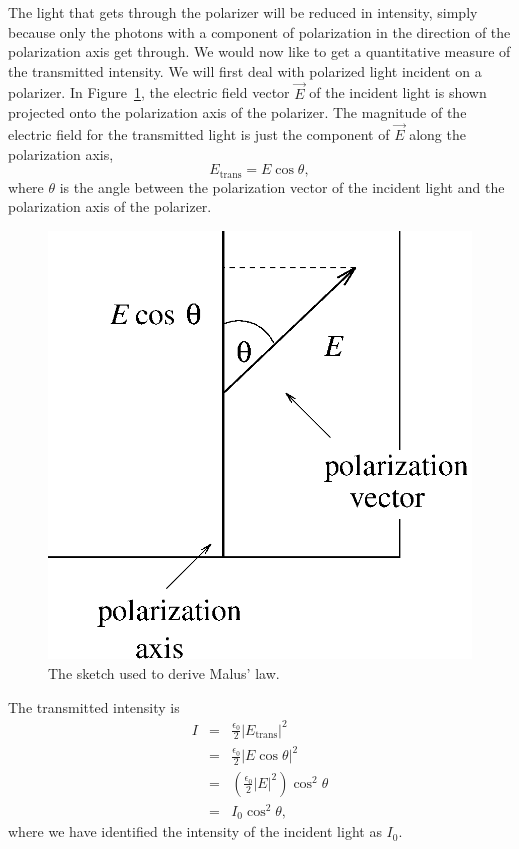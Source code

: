 The light that gets through the polarizer will be reduced in intensity, simply
because only the photons with a component of polarization in the direction of 
the polarization axis get through. We would now like to get a quantitative 
measure of the transmitted intensity.  We will first deal with polarized light 
incident on a polarizer. In Figure~\ref{fig:pol:malus}, the electric field 
vector $\vec{E}$ of the incident light is shown projected onto the 
polarization axis of the polarizer. The magnitude of the electric field for 
the transmitted light is just the component of $\vec{E}$ along the 
polarization axis,
$$ E_{\mbox{trans}} = E \cos\theta, $$
where $\theta$ is the angle between the polarization vector of the incident 
light and the polarization axis of the polarizer. 
\begin{figure}[hb]
\centering 
\epsfxsize=6cm \includegraphics[scale=0.6]{7_polarization/malus.eps}
\caption{The sketch used to derive Malus' law.}
\label{fig:pol:malus}
\end{figure}
The transmitted intensity is
\begin{eqnarray*}
I &=& \frac{\epsilon_0}{2} |E_{\mbox{trans}}|^2  \\
&=& \frac{\epsilon_0}{2} |E \cos\theta |^2   \\
&=& \left( \frac{\epsilon_0}{2} |E|^2 \right) \cos^2\theta  \\ 
&=& I_0 \cos^2\theta,
\end{eqnarray*}
where we have identified the intensity of the incident light as $I_0$.

